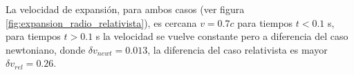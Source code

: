 \documentclass[12pt,a4paper]{book}
\begin{document}

La velocidad de expansión, para ambos casos (ver figura \ref{fig:expansion_radio_relativista}), es cercana $v = 0.7 c$ para tiempos $t<0.1$ s, para tiempos $t > 0.1$ s la velocidad se vuelve constante pero a diferencia del caso newtoniano, donde $\delta v_{newt} = 0.013$, la diferencia del caso relativista es mayor $\delta v_{rel} = 0.26$.


\begin{figure}
\centering
{}

\end{figure}
\end{document}
